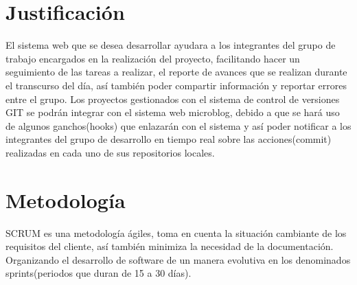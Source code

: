 \section{Justificación}
El sistema web que se desea desarrollar ayudara  a los integrantes del grupo de trabajo encargados en la realización del proyecto, facilitando hacer un seguimiento de las tareas a realizar, el reporte de avances que se realizan durante el transcurso del día, así también poder compartir información y reportar errores entre el grupo.
Los proyectos gestionados con el sistema de control de versiones GIT se podrán integrar con el sistema web microblog, debido a que se hará uso de algunos ganchos(hooks) que enlazarán con el sistema y así poder notificar a los integrantes del grupo de desarrollo en tiempo real sobre las acciones(commit) realizadas en cada uno de sus repositorios locales.
\section{Metodología}
SCRUM es una metodología ágiles, toma en cuenta la situación cambiante de los requisitos del cliente, así también minimiza la necesidad de la documentación.
Organizando el desarrollo de software de un manera evolutiva en los denominados sprints(periodos que duran de 15 a 30 días).


%
